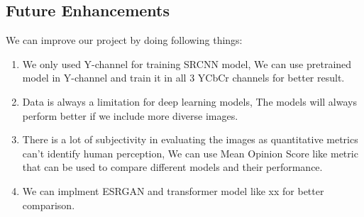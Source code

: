 \subsection{Future Enhancements}
We can improve our project by doing following things:
\begin{enumerate}
    \item We only used Y-channel for training SRCNN model, We can use pretrained model in Y-channel and train it in all 3 YCbCr channels for better result.
    \item Data is always a limitation for deep learning models, The models will always perform better if we include more diverse images.
    \item There is a lot of subjectivity in evaluating the images as quantitative metrics can't identify human perception, We can use Mean Opinion Score like metric that can be used to compare different models and their performance.
    \item  We can implment ESRGAN and transformer model like xx for better comparison.
\end{enumerate}
